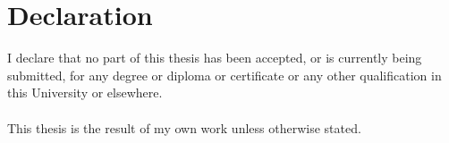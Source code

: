 \chapter*{Declaration}

I declare that no part of this thesis has been accepted, or is currently being submitted,
for any degree or diploma or certificate or any other qualification in this University or
elsewhere.
\\~\\
\noindent This thesis is the result of my own work unless otherwise stated.
